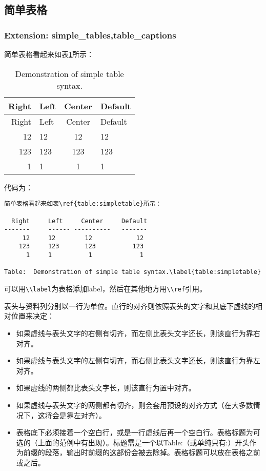 \documentclass[cn]{elegantbook}
\providecommand{\tightlist}{%
  \setlength{\itemsep}{0pt}\setlength{\parskip}{0pt}}
\newcommand{\passthrough}[1]{#1}
\begin{document}
\hypertarget{ux7b80ux5355ux8868ux683c}{%
\subsection{简单表格}\label{ux7b80ux5355ux8868ux683c}}

\hypertarget{extension-simple_tablestable_captions}{%
\subsubsection{Extension:
simple\_tables,table\_captions}\label{extension-simple_tablestable_captions}}

简单表格看起来如表\ref{table:simpletable}所示：

\begin{longtable}[]{@{}rlcl@{}}
\caption{Demonstration of simple table
syntax.\label{table:simpletable}}\tabularnewline
\toprule
Right & Left & Center & Default\tabularnewline
\midrule
\endfirsthead
\toprule
Right & Left & Center & Default\tabularnewline
\midrule
\endhead
12 & 12 & 12 & 12\tabularnewline
123 & 123 & 123 & 123\tabularnewline
1 & 1 & 1 & 1\tabularnewline
\bottomrule
\end{longtable}

代码为：

\begin{lstlisting}
简单表格看起来如表\ref{table:simpletable}所示：

  Right     Left     Center     Default
-------     ------ ----------   -------
     12     12        12            12
    123     123       123          123
      1     1          1             1

Table:  Demonstration of simple table syntax.\label{table:simpletable}
\end{lstlisting}

可以用\passthrough{\lstinline!\\label!}为表格添加label，然后在其他地方用\passthrough{\lstinline!\\ref!}引用。

表头与资料列分别以一行为单位。直行的对齐则依照表头的文字和其底下虚线的相对位置来决定：

\begin{itemize}
\tightlist
\item
  如果虚线与表头文字的右侧有切齐，而左侧比表头文字还长，则该直行为靠右对齐。
\item
  如果虚线与表头文字的左侧有切齐，而右侧比表头文字还长，则该直行为靠左对齐。
\item
  如果虚线的两侧都比表头文字长，则该直行为置中对齐。
\item
  如果虚线与表头文字的两侧都有切齐，则会套用预设的对齐方式（在大多数情况下，这将会是靠左对齐）。
\item
  表格底下必须接着一个空白行，或是一行虚线后再一个空白行。表格标题为可选的（上面的范例中有出现）。标题需是一个以Table:（或单纯只有:）开头作为前缀的段落，输出时前缀的这部份会被去除掉。表格标题可以放在表格之前或之后。
\end{itemize}
\end{document}
